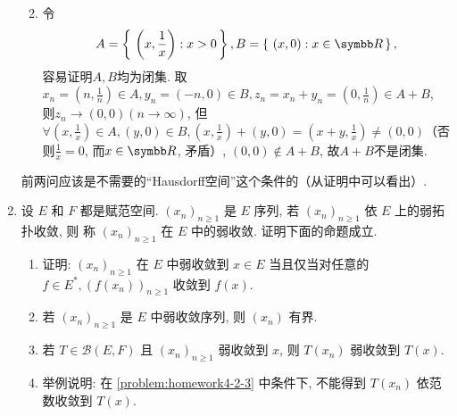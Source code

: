 \begin{enumerate}
\begin{answer}
\begin{enumerate}
            \item 令\[
                A=\set{\left(x,\frac{1}{x}\right)}{x>0}, B=\set{(x,0)}{x\in \R},\]容易证明$A, B$均为闭集. 取$x_n=(n,\frac{1}{n})\in A, y_n=(-n,0)\in B, z_n=x_n+y_n=(0,\frac{1}{n})\in A+B$, 则$z_n \to (0,0) (n\to \infty)$, 但$\forall (x,\frac{1}{x})\in A, (y,0)\in B, (x, \frac{1}{x})+ (y,0)=(x+y,\frac{1}{x}) \neq  (0,0)$（否则$\frac{1}{x}=0$, 而$x\in \R$, 矛盾）, \ie $(0,0)\notin A+B$, 故$A+B$不是闭集.
        \end{enumerate}
        \begin{remark}
            前两问应该是不需要的“Hausdorff空间”这个条件的（从证明中可以看出）.
        \end{remark}
    \end{answer}
    \item 设 $E$ 和 $F$ 都是赋范空间. $\left(x_{n}\right)_{n \geq 1}$ 是 $E$ 序列, 若 $\left(x_{n}\right)_{n \geq 1}$ 依 $E$ 上的弱拓扑收敛, 则 称 $\left(x_{n}\right)_{n \geq 1}$ 在 $E$ 中的弱收敛. 证明下面的命题成立.
      \begin{enumerate}
        \item 证明: $\left(x_{n}\right)_{n \geq 1}$ 在 $E$ 中弱收敛到 $x \in E$ 当且仅当对任意的 $f \in E^{*},\left(f\left(x_{n}\right)\right)_{n \geq 1}$ 收敛到 $f(x)$.
        \item 若 $\left(x_{n}\right)_{n \geq 1}$ 是 $E$ 中弱收敛序列, 则 $\left(x_{n}\right)$ 有界.
        \item\label{problem:homework4-2-3} 若 $T \in \mathcal{B}(E, F)$ 且 $\left(x_{n}\right)_{n \geq 1}$ 弱收敛到 $x$, 则 $T\left(x_{n}\right)$ 弱收敛到 $T(x)$.
        \item 举例说明: 在 \ref{problem:homework4-2-3} 中条件下, 不能得到 $T\left(x_{n}\right)$ 依范数收敛到 $T(x)$.

\end{enumerate}
\end{enumerate}
